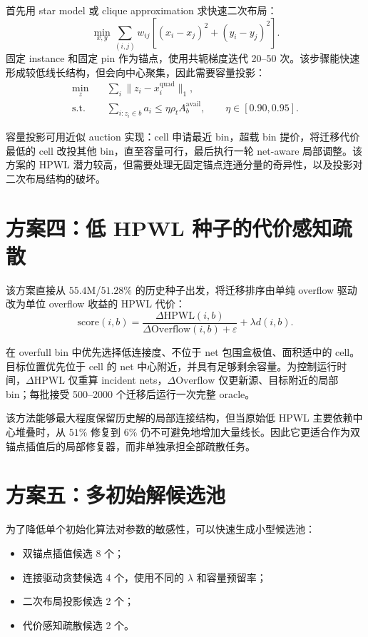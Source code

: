 \documentclass[11pt,a4paper]{ctexart}
\begin{document}
首先用 star model 或 clique approximation 求快速二次布局：
\begin{equation}
  \min_{x,y}\sum_{(i,j)}w_{ij}
  \left[(x_i-x_j)^2+(y_i-y_j)^2\right].
\end{equation}
固定 instance 和固定 pin 作为锚点，使用共轭梯度迭代 20--50 次。该步骤能快速形成较低线长结构，但会向中心聚集，因此需要容量投影：
\begin{align}
  \min_z\quad &\sum_i\lVert z_i-x_i^{\mathrm{quad}}\rVert_1,\\
  \text{s.t.}\quad &\sum_{i:z_i\in b}a_i\leq\eta\rho_t A_b^{\mathrm{avail}},
  \qquad \eta\in[0.90,0.95].
\end{align}

容量投影可用近似 auction 实现：cell 申请最近 bin，超载 bin 提价，将迁移代价最低的 cell 改投其他 bin，直至容量可行，最后执行一轮 net-aware 局部调整。该方案的 HPWL 潜力较高，但需要处理无固定锚点连通分量的奇异性，以及投影对二次布局结构的破坏。

\section{方案四：低 HPWL 种子的代价感知疏散}

该方案直接从 $55.4$M/$51.28\%$ 的历史种子出发，将迁移排序由单纯 overflow 驱动改为单位 overflow 收益的 HPWL 代价：
\begin{equation}
  \mathrm{score}(i,b)=
  \frac{\Delta\mathrm{HPWL}(i,b)}
  {\Delta\mathrm{Overflow}(i,b)+\varepsilon}
  +\lambda d(i,b).
\end{equation}

在 overfull bin 中优先选择低连接度、不位于 net 包围盒极值、面积适中的 cell。目标位置优先位于 cell 的 net 中心附近，并具有足够剩余容量。为控制运行时间，$\Delta\mathrm{HPWL}$ 仅重算 incident nets，$\Delta\mathrm{Overflow}$ 仅更新源、目标附近的局部 bin；每批接受 500--2000 个迁移后运行一次完整 oracle。

该方法能够最大程度保留历史解的局部连接结构，但当原始低 HPWL 主要依赖中心堆叠时，从 $51\%$ 修复到 $6\%$ 仍不可避免地增加大量线长。因此它更适合作为双锚点插值后的局部修复器，而非单独承担全部疏散任务。

\section{方案五：多初始解候选池}

为了降低单个初始化算法对参数的敏感性，可以快速生成小型候选池：
\begin{itemize}
  \item 双锚点插值候选 8 个；
  \item 连接驱动贪婪候选 4 个，使用不同的 $\lambda$ 和容量预留率；
  \item 二次布局投影候选 2 个；
  \item 代价感知疏散候选 2 个。
\end{itemize}
\end{document}
